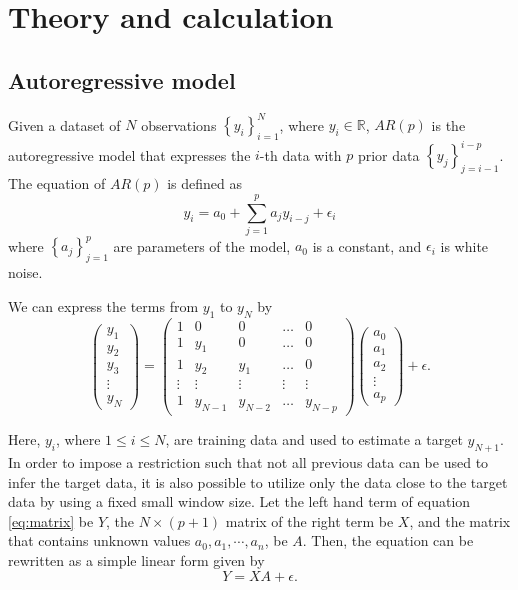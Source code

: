 \documentclass[final,authoryear,5p,times,twocolumn]{elsarticle}
\begin{document}
\section{Theory and calculation}
\label{section:Sec3}



\subsection{Autoregressive model}
\label{section:Sec3.1}
Given a dataset of $N$ observations $\left \{ y_i \right \}_{i=1}^{N}$, where $y_i\in \mathbb{R}$, $AR(p)$ is the autoregressive model that expresses the $i$-th data with $p$ prior data $\left \{ y_j \right \}_{j=i-1}^{i-p}$. The equation of $AR(p)$ is defined as
\[
y_i=a_0+\sum_{j=1}^p a_jy_{i-j}+\epsilon_i
\]
where $\left \{ a_j \right \}_{j=1}^{p}$ are parameters of the model, $a_0$ is a constant, and $\epsilon_i$ is white noise.

We can express the terms from $y_{1}$ to $y_{N}$ by
\begin{equation} \label{eq:matrix}
\begin{pmatrix}
y_{1}\\ y_{2}\\ y_3 \\ \vdots\\ y_N
\end{pmatrix}
=
\begin{pmatrix} 
1 & 0 & 0 & \ldots & 0 \\ 
1 & y_1 & 0 & \ldots & 0 \\ 
1 & y_2 & y_1 & \ldots & 0\\ 
\vdots & \vdots & \vdots & \vdots & \vdots \\ 
1 & y_{N-1} & y_{N-2} & \ldots & y_{N-p}
\end{pmatrix}
\begin{pmatrix}
a_0\\a_1\\a_2\\ \vdots\\ a_p
\end{pmatrix}
+ \epsilon.
\end{equation}

Here, $y_i$, where $1 \leq i \leq N$, are training data and used to estimate a target $y_{N+1}$. In order to impose a restriction such that not all previous data can be used to infer the target data, it is also possible to utilize only the data close to the target data by using a fixed small window size. Let the left hand term of equation \eqref{eq:matrix} be $Y$, the $N \times (p+1)$ matrix of the right term be $X$, and the matrix that contains unknown values $a_0,a_1,\cdots,a_n$, be $A$. Then, the equation can be rewritten as a simple linear form given by
\begin{equation} \label{eq:linear}
Y=XA+\epsilon.
\end{equation}
\end{document}
